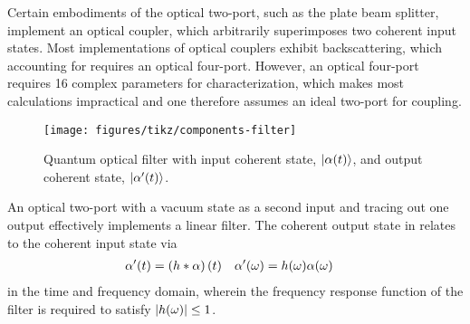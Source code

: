 Certain embodiments of the optical two-port, such as the plate beam splitter, implement an optical coupler, which arbitrarily superimposes two coherent input states.
Most implementations of optical couplers exhibit backscattering, which accounting for requires an optical four-port.
However, an optical four-port requires \num{16} complex parameters for characterization, which makes most calculations impractical and one therefore assumes an ideal two-port for coupling.
\begin{figure}[htb]
    \centering
    \texttt{[image: figures/tikz/components-filter]}
    \caption{Quantum optical filter with input coherent state, $\lvert\alpha(t)\rangle$, and output coherent state, $\lvert\alpha^\prime(t)\rangle$.}\label{fig:components_filter}
\end{figure}
An optical two-port with a vacuum state as a second input and tracing out one output effectively implements a linear filter.
The coherent output state in  relates to the coherent input state via
\begin{align*}
	\alpha^\prime(t)
	&=
	\left(h\ast\alpha\right)(t)
	&
	\alpha^\prime(\omega)
	&=
	h(\omega)
	\alpha(\omega)
\end{align*}
in the time and frequency domain, wherein the frequency response function of the filter is required to satisfy $\lvert h(\omega)\rvert\leq1$.

